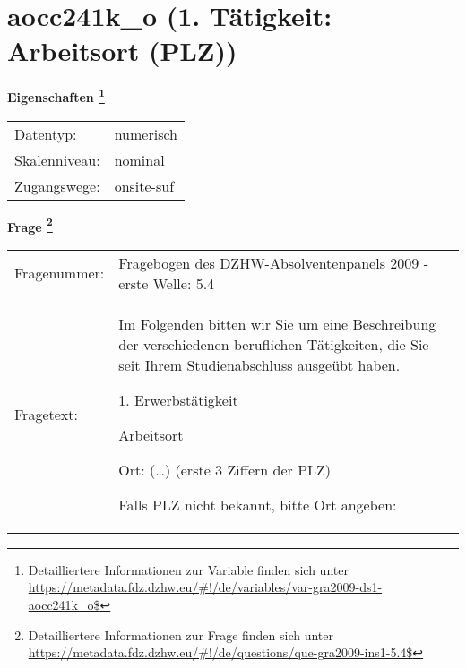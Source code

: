 
    \setcounter{footnote}{0}

    \vspace*{-1.8cm}
	\section{aocc241k\_o (1. Tätigkeit: Arbeitsort (PLZ))}
	\label{section:aocc241k_o}



    \vspace*{0.5cm}
    \noindent\textbf{Eigenschaften
	\footnote{Detailliertere Informationen zur Variable finden sich unter
		\url{https://metadata.fdz.dzhw.eu/\#!/de/variables/var-gra2009-ds1-aocc241k_o$}}}\\
	\begin{tabularx}{\hsize}{@{}lX}
	Datentyp: & numerisch \\
	Skalenniveau: & nominal \\
	Zugangswege: &
	  onsite-suf
 \\
    \end{tabularx}



				\vspace*{0.5cm}
                \noindent\textbf{Frage
	                \footnote{Detailliertere Informationen zur Frage finden sich unter
		              \url{https://metadata.fdz.dzhw.eu/\#!/de/questions/que-gra2009-ins1-5.4$}}}\\
				\begin{tabularx}{\hsize}{@{}lX}
					Fragenummer: &
					  Fragebogen des DZHW-Absolventenpanels 2009 - erste Welle:
					  5.4
 \\
					Fragetext: & Im Folgenden bitten wir Sie um eine Beschreibung der verschiedenen beruflichen Tätigkeiten, die Sie seit Ihrem Studienabschluss ausgeübt haben.\par  1. Erwerbstätigkeit\par  Arbeitsort\par  Ort: (…) (erste 3 Ziffern der PLZ)\par  Falls PLZ nicht bekannt, bitte Ort angeben: \\
				\end{tabularx}





